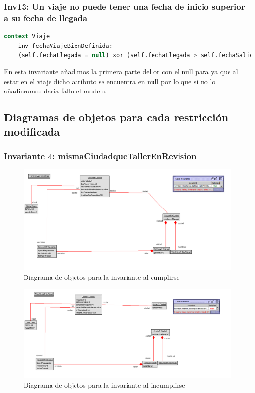 \documentclass[12pt.a4paper]{article}
\begin{document}
\subsubsection{Inv13: Un viaje no puede tener una fecha de inicio superior a su fecha de llegada}
    \begin{lstlisting}[style = useEspecifico,language=SQL]
context Viaje
    inv fechaViajeBienDefinida:
    (self.fechaLlegada = null) xor (self.fechaLlegada > self.fechaSalida)
    \end{lstlisting}
    En esta invariante añadimos la primera parte del or con el null para ya que al estar en el viaje dicho atributo se encuentra en null por lo que si no lo añadieramos daría fallo el modelo.

\subsection{Diagramas de objetos para cada restricción modificada}
\subsubsection{Invariante 4: mismaCiudadqueTallerEnRevision}
\vspace{1.0 cm}
\begin{figure}[H]
     \includegraphics[width=1\linewidth]{Soils/dinamico_inv4_bien.png}
     \caption{Diagrama de objetos para la invariante al cumplirse}
\end{figure}

\begin{figure}[H]
     \includegraphics[width=1\linewidth]{Soils/dinamico_inv4_false.png}
     \caption{Diagrama de objetos para la invariante al incumplirse}
\end{figure}
\end{document}
